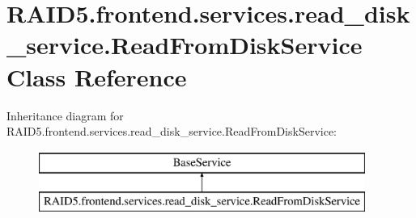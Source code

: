 \hypertarget{class_r_a_i_d5_1_1frontend_1_1services_1_1read__disk__service_1_1_read_from_disk_service}{}\section{R\+A\+I\+D5.\+frontend.\+services.\+read\+\_\+disk\+\_\+service.\+Read\+From\+Disk\+Service Class Reference}
\label{class_r_a_i_d5_1_1frontend_1_1services_1_1read__disk__service_1_1_read_from_disk_service}
Inheritance diagram for R\+A\+I\+D5.\+frontend.\+services.\+read\+\_\+disk\+\_\+service.\+Read\+From\+Disk\+Service\+:\begin{figure}[H]
\begin{center}
\leavevmode
\includegraphics[height=2.000000cm]{class_r_a_i_d5_1_1frontend_1_1services_1_1read__disk__service_1_1_read_from_disk_service}
\end{center}
\end{figure}
